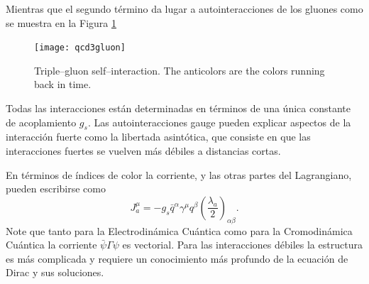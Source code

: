 Mientras que el segundo término da lugar a autointeracciones de los gluones como se muestra en la Figura \ref{fig:qcd3gluon}
\begin{figure}
  \centering
  \texttt{[image: qcd3gluon]}%
  \caption{Triple--gluon self--interaction. The anticolors are the colors running back in time.}
  \label{fig:qcd3gluon}
\end{figure}


Todas las interacciones están determinadas en términos de una única constante de acoplamiento $g_s$. Las autointeracciones gauge pueden explicar aspectos de la interacción fuerte como la libertada asintótica, que consiste en que las interacciones fuertes se vuelven más débiles a distancias cortas. 

En términos de índices de color la corriente, y las otras partes del Lagrangiano, pueden escribirse como
\begin{equation}
  \label{eq:223qft}
  J^\mu_a=-g_s\bar{q}^\alpha\gamma^\mu q^\beta\left(\frac{\lambda_a}{2}\right)_{\alpha\beta}.
\end{equation}
Note que tanto para la Electrodinámica Cuántica como para la Cromodinámica Cuántica la corriente $\bar{\psi}\Gamma\psi$ es vectorial. Para las interacciones débiles la estructura es más complicada y requiere un conocimiento más profundo de la ecuación de Dirac y sus soluciones.

